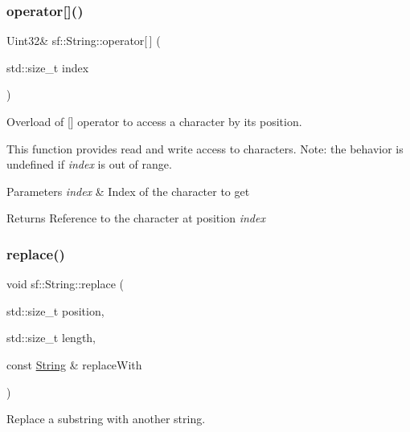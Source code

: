 \subsubsection{\texorpdfstring{operator[]()}{operator[]()}\hspace{0.1cm}{\footnotesize\ttfamily [2/2]}}
{\footnotesize\ttfamily Uint32\& sf\+::\+String\+::operator\mbox{[}$\,$\mbox{]} (\begin{DoxyParamCaption}\item[{std\+::size\+\_\+t}]{index }\end{DoxyParamCaption})}



Overload of \mbox{[}\mbox{]} operator to access a character by its position. 

This function provides read and write access to characters. Note\+: the behavior is undefined if {\itshape index} is out of range.


\begin{DoxyParams}{Parameters}
{\em index} & Index of the character to get\\
\hline
\end{DoxyParams}
\begin{DoxyReturn}{Returns}
Reference to the character at position {\itshape index} \begin{DoxyVerb}\end{DoxyVerb}
 
\end{DoxyReturn}
\mbox{\label{classsf_1_1_string_ad460e628c287b0fa88deba2eb0b6744b}} 
\subsubsection{\texorpdfstring{replace()}{replace()}\hspace{0.1cm}{\footnotesize\ttfamily [1/2]}}
{\footnotesize\ttfamily void sf\+::\+String\+::replace (\begin{DoxyParamCaption}\item[{std\+::size\+\_\+t}]{position,  }\item[{std\+::size\+\_\+t}]{length,  }\item[{const \mbox{\hyperlink{classsf_1_1_string}{String}} \&}]{replace\+With }\end{DoxyParamCaption})}



Replace a substring with another string. 

